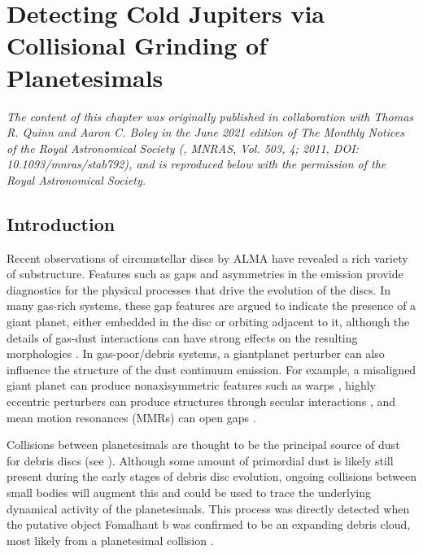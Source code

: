 \chapter {Detecting Cold Jupiters via Collisional Grinding of Planetesimals}\label{ch:grind}

\noindent \textit{The content of this chapter was originally published in collaboration with Thomas R. Quinn and Aaron C. Boley in the June 2021 edition of The Monthly Notices of the Royal Astronomical Society (\cite{wallace21}, MNRAS, Vol. 503, 4; 2011, DOI: 10.1093/mnras/stab792), and is reproduced below with the permission of the Royal Astronomical Society.}

\section{Introduction} \label{sec:intro}

Recent observations of circumstellar discs by ALMA have revealed a rich variety of substructure. Features such as gaps and 
asymmetries \cite{alma15, perez16, isella16, andrews16, cieza16} in the emission provide diagnostics for the physical 
processes that drive the evolution of the discs. In many gas-rich systems, these gap features are argued to indicate the 
presence of a giant planet, either embedded in the disc \cite{dipierro15} or orbiting adjacent to it, although the details of gas-dust 
interactions can have strong effects on the resulting morphologies \cite{dong18}. In gas-poor/debris systems, a giantplanet 
perturber can also influence the structure of the dust continuum emission. For example, a misaligned giant planet can produce 
nonaxisymmetric features such as warps \cite{augereau01}, highly eccentric perturbers can produce structures through secular 
interactions \cite{pearce14, pearce15}, and mean motion resonances (MMRs) can open gaps
\cite{nesvold15, tabeshian16, tabeshian18}.

Collisions between planetesimals are thought to be the principal source of dust for debris discs (see \cite{wyatt08}).  Although 
some amount of primordial dust is likely still present during the early stages of debris disc evolution, ongoing collisions between 
small bodies will augment this and could be used to trace the underlying dynamical activity of the planetesimals. This process 
was directly detected when the putative object Fomalhaut b was confirmed to be an expanding debris cloud, most likely from a 
planetesimal collision \cite{gaspar20}. 

